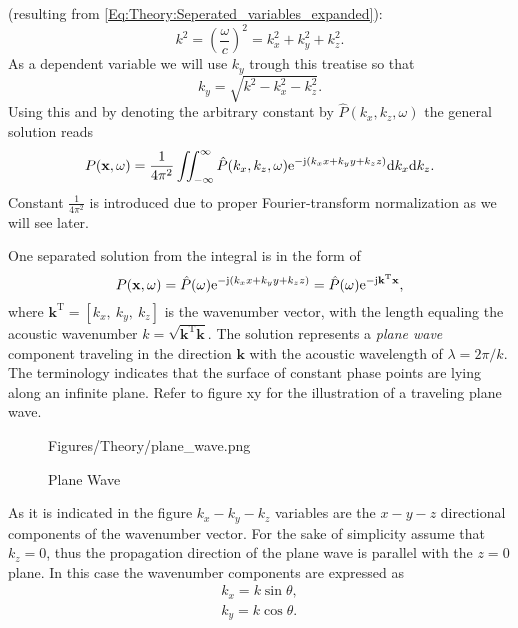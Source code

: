 (resulting from \eqref{Eq:Theory:Seperated_variables_expanded}):
\begin{equation}
k^2 = \left( \frac{\omega}{c} \right)^2 = k_x^2 + k_y^2 + k_z^2.
\end{equation}
As a dependent variable we will use $k_y$ trough this treatise so that
\begin{equation}
k_y = \sqrt{ k^2 - k_x^2 - k_z^2 }.
\end{equation}
Using this and by denoting the arbitrary constant by $\hat{P}(k_x,k_z, \omega)$ the general solution reads
\begin{equation}
P(\mathbf{x},\omega) = \frac{1}{4\pi^2}\iint_{-\infty}^{\infty} \hat{P}(k_x,k_z, \omega)  \mathrm{e}^{- \mathrm{j} \left( k_x x + k_y y + k_z z \right) }
\mathrm{d} k_x\mathrm{d} k_z.
\label{Eq:Theory:Helmholtz_Inverse_Fourier}
\end{equation}
Constant $\frac{1}{4\pi^2}$ is introduced due to proper Fourier-transform normalization as we will see later.

\vspace{3mm}
One separated solution from the integral is in the form of \cite{Williams1999}
\begin{equation}
P(\mathbf{x},\omega) = \hat{P}(\omega) \mathrm{e}^{-\mathrm{j} \left( k_x x + k_y y + k_z z \right) } =  \hat{P}(\omega) \mathrm{e}^{-\mathrm{j} \mathbf{k}^{\mathrm{T}} \mathbf{x} },
\end{equation}
where $\mathbf{k}^{\mathrm{T}} = [k_x,\ k_y,\ k_z]$ is the wavenumber vector, with the length equaling the acoustic wavenumber $k = \sqrt{ \mathbf{k}^{\mathrm{T}}  \mathbf{k}}$.
The solution represents a \emph{plane wave} component traveling in the direction $\mathbf{k}$ with the acoustic wavelength of $\lambda = 2\pi/k$. The terminology indicates that the surface of constant phase points are lying along an infinite plane. Refer to figure xy for the illustration of a traveling plane wave.

\begin{figure}[!h]
	\centering
	\begin{overpic}[width = 1\columnwidth]{Figures/Theory/plane_wave.png}
	\end{overpic}
\caption{Plane Wave}
	\label{Fig:Theory:plane_wave}
\end{figure}

As it is indicated in the figure $k_x-k_y-k_z$ variables are the $x-y-z$ directional components of the wavenumber vector. For the sake of simplicity assume that $k_z = 0$, thus the propagation direction of the plane wave is parallel with the $z=0$ plane. In this case the wavenumber components are expressed as
\begin{eqnarray}
k_x = k \sin \theta , \\
k_y = k \cos \theta .
\end{eqnarray}
  
